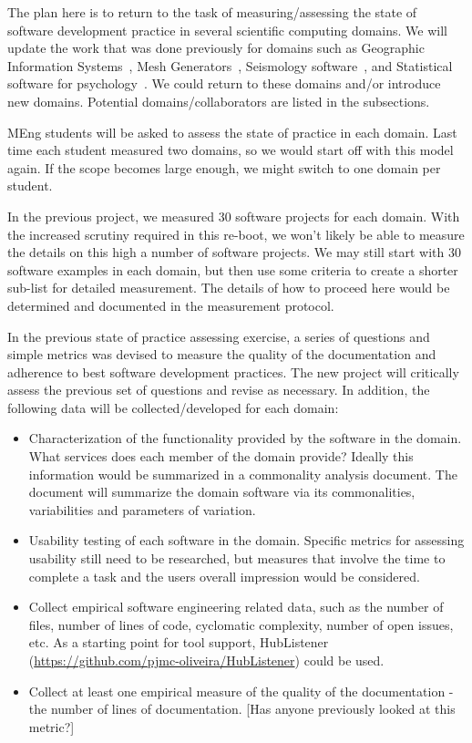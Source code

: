 \documentclass[12pt]{article}
\begin{document}
The plan here is to return to the task of measuring/assessing the state of
software development practice in several scientific computing domains.  We will
update the work that was done previously for domains such as Geographic
Information Systems~\cite{SmithEtAl2018_arXivGIS}, Mesh
Generators~\cite{SmithEtAl2016}, Seismology software~\cite{SmithEtAl2018}, and
Statistical software for psychology~\cite{SmithEtAl2018_StatSoft}.  We could
return to these domains and/or introduce new domains.  Potential domains/collaborators
are listed in the subsections.

MEng students will be asked to assess the state of practice in each domain.
Last time each student measured two domains, so we would start off with this
model again.  If the scope becomes large enough, we might switch to one domain
per student.

In the previous project, we measured 30 software projects for each domain.  With
the increased scrutiny required in this re-boot, we won't likely be able to
measure the details on this high a number of software projects.  We may still
start with 30 software examples in each domain, but then use some criteria to
create a shorter sub-list for detailed measurement.  The details of how to
proceed here would be determined and documented in the measurement protocol.

In the previous state of practice assessing exercise, a series of questions and
simple metrics was devised to measure the quality of the documentation and
adherence to best software development practices.  The new project will
critically assess the previous set of questions and revise as necessary.  In
addition, the following data will be collected/developed for each domain:

\begin{itemize}
\item Characterization of the functionality provided by the software in the
  domain.  What services does each member of the domain provide?  Ideally this
  information would be summarized in a commonality analysis document.  The
  document will summarize the domain software via its commonalities,
  variabilities and parameters of variation.
\item Usability testing of each software in the domain.  Specific metrics for
  assessing usability still need to be researched, but measures that involve the
  time to complete a task and the users overall impression would be considered.
\item Collect empirical software engineering related data, such as the number of
  files, number of lines of code, cyclomatic complexity, number of open issues,
  etc.  As a starting point for tool support, HubListener
  (\url{https://github.com/pjmc-oliveira/HubListener}) could be used.
\item Collect at least one empirical measure of the quality of the documentation
  - the number of lines of documentation.  [Has anyone previously looked at this
  metric?]
\end{itemize}
\end{document}
